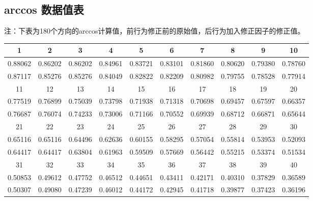 \documentclass[withoutpreface,bwprint]{cumcmthesis} %
\begin{document}
\section{}
  \subsection{arccos 数据值表}
    注：下表为180个方向的arccos计算值，前行为修正前的原始值，后行为加入修正因子的修正值。
    \begin{center}
      \label{uujubn}
      \small
      \begin{longtable}{cccccccccc}
        \hline
        1        & 2        & 3        & 4        & 5        & 6        & 7        & 8        & 9        & 10       \\ \hline
        0.88062  & 0.86202  & 0.86202  & 0.84961  & 0.83721  & 0.83101  & 0.81860  & 0.80620  & 0.79380  & 0.78760  \\
        0.87117  & 0.85276  & 0.85276  & 0.84049  & 0.82822  & 0.82209  & 0.80982  & 0.79755  & 0.78528  & 0.77914  \\
        \hline
        11       & 12       & 13       & 14       & 15       & 16       & 17       & 18       & 19       & 20       \\
        \hline
        0.77519  & 0.76899  & 0.75039  & 0.73798  & 0.71938  & 0.71318  & 0.70698  & 0.69457  & 0.67597  & 0.66357  \\
        0.76687  & 0.76074  & 0.74233  & 0.73006  & 0.71166  & 0.70552  & 0.69939  & 0.68712  & 0.66871  & 0.65644  \\
        \hline
        21       & 22       & 23       & 24       & 25       & 26       & 27       & 28       & 29       & 30       \\
        \hline
        0.65116  & 0.65116  & 0.64496  & 0.62636  & 0.60155  & 0.58295  & 0.57054  & 0.55814  & 0.53953  & 0.52093  \\
        0.64417  & 0.64417  & 0.63804  & 0.61963  & 0.59509  & 0.57669  & 0.56442  & 0.55215  & 0.53374  & 0.51534  \\
        \hline
        31       & 32       & 33       & 34       & 35       & 36       & 37       & 38       & 39       & 40       \\
        \hline
        0.50853  & 0.49612  & 0.47752  & 0.46512  & 0.44651  & 0.43411  & 0.42171  & 0.40310  & 0.37829  & 0.36589  \\
        0.50307  & 0.49080  & 0.47239  & 0.46012  & 0.44172  & 0.42945  & 0.41718  & 0.39877  & 0.37423  & 0.36196  \\

\end{longtable}
\end{center}
\end{document}

